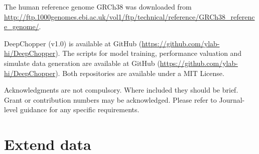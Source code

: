 \documentclass[pdflatex, sn-mathphys-num, lineno]{sn-jnl}%
\theoremstyle{thmstyleone}%
\theoremstyle{thmstyletwo}%
\theoremstyle{thmstylethree}%
\begin{document}

The human reference genome GRCh38 was downloaded from \url{http://ftp.1000genomes.ebi.ac.uk/vol1/ftp/technical/reference/GRCh38\_reference\_genome/}.



DeepChopper (v1.0) is available at GitHub (\url{https://github.com/ylab-hi/DeepChopper}).
The scripts for model training, performance valuation and simulate data generation are available at GitHub (\url{https://github.com/ylab-hi/DeepChopper}).
Both repositories are available under a MIT License.


Acknowledgments are not compulsory. Where included they should be brief. Grant or contribution numbers may be acknowledged.
Please refer to Journal-level guidance for any specific requirements.


\backmatter

\begin{appendices}
	\printglossaries[type=\acronymtype, title=Abbreviations]
\end{appendices}






\newpage

\section{Extend data}

\renewcommand{\figurename}{Extended Data Fig.}
\end{document}

